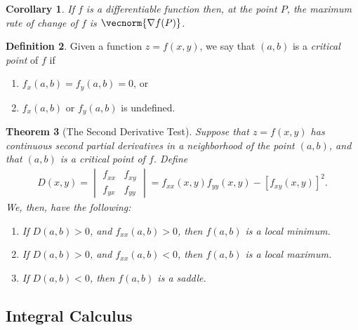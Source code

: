\documentclass{article}[11pt]
\newtheorem{theorem}{Theorem}[section]
\newtheorem{corollary}[theorem]{Corollary}
\theoremstyle{definition}
\newtheorem{definition}[theorem]{Definition}
\numberwithin{equation}{section}
\begin{document}
\begin{corollary}
	If \(f\) is a differentiable function then, at the point \(P\), the maximum rate of change of \(f\) is \( \vecnorm{\nabla f(P)} \).
\end{corollary}
\begin{definition}
	Given a function \(z=f(x,y)\), we say that \((a,b)\) is a \emph{critical point} of \(f\) if
	\begin{enumerate}
		\item \(f_x(a,b)=f_y(a,b)=0\), or
		\item \(f_x(a,b)\) or \(f_y(a,b)\) is undefined.
	\end{enumerate}
\end{definition}
\begin{theorem}[The Second Derivative Test]
	Suppose that \(z=f(x,y)\) has continuous second partial derivatives in a neighborhood of the point \((a,b)\), and that \((a,b)\) is a critical point of \(f\). Define
	\begin{align*}
	D(x,y)=
	\begin{vmatrix}
	f_{xx}& f_{xy}\\ 
	f_{yx}& f_{yy} 
	\end{vmatrix}
	=f_{xx}(x,y)f_{yy}(x,y)-\left[ f_{xy}(x,y) \right]^2.
	\end{align*}
	We, then, have the following:
	\begin{enumerate}
		\item If \(D(a,b)>0\), and \(f_{xx}(a,b)>0\), then \(f(a,b)\) is a local minimum.
		\item If \(D(a,b)>0\), and \(f_{xx}(a,b)<0\), then \(f(a,b)\) is a local maximum.
		\item If \(D(a,b)<0\), then \(f(a,b)\) is a saddle.
	\end{enumerate}
\end{theorem}
\subsection{Integral Calculus}
\end{document}
